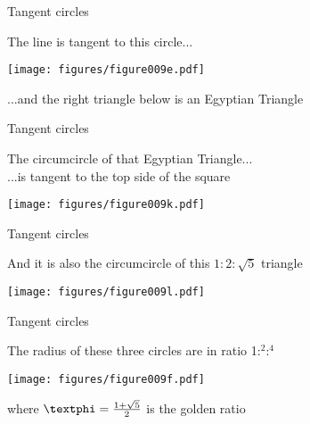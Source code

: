 \documentclass[14pt]{beamer}
\begin{document}
    \begin{frame}{Tangent circles}
        \begin{center}
            The line is tangent to this circle...
        \end{center}
        \hspace{6.18em} \texttt{[image: figures/figure009e.pdf]} \\
        \begin{center}
             ...and the right triangle below is an Egyptian Triangle
        \end{center}
    \end{frame}


    \begin{frame}{Tangent circles}
        \begin{center}
            The circumcircle of that Egyptian Triangle...\\[0.5ex]...is tangent to the top side of the square
        \end{center}
        \hspace{5.05em} \texttt{[image: figures/figure009k.pdf]} \\
        \vspace{1.75em}
    \end{frame}


    \begin{frame}{Tangent circles}
        \begin{center}
            And it is also the circumcircle of this $1\!\!:\!\!2\!\!:\!\!\sqrt{5}$ triangle
        \end{center}
        \vspace{1.5em}
        \hspace{5.05em} \texttt{[image: figures/figure009l.pdf]} \\
        \vspace{1.75em}
    \end{frame}


    \begin{frame}{Tangent circles}
        \begin{center}
            The radius of these three circles are in ratio 1:\textphi$^2$:\textphi$^4$
        \end{center}\medskip
        \hspace{6.18em} \texttt{[image: figures/figure009f.pdf]} \\
        \begin{center}
             where $\text{\textphi} =\tfrac{1+\sqrt{5}}{2}$ is the golden ratio
        \end{center}
    \end{frame}
\end{document}

